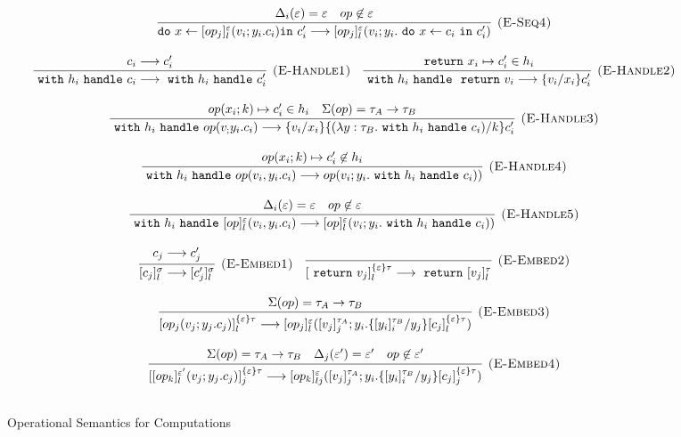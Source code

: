 \begin{figure}[p]
{\[\begin{array}{c}
\infer[\textsc{(E-Seq4)}]
  {\texttt{do}\ x \leftarrow [op_j]^\varepsilon_l(v_i; y_i.c_i) \texttt{in}\ c_i' \longrightarrow [op_j]^\varepsilon_l(v_i; y_i. \m{do} x \leftarrow c_i \m{in} c_i')}
  {\Delta_i(\varepsilon) = \varepsilon & op \not \in \varepsilon} \\[3ex]
  

  
 \infer[\textsc{(E-Handle1)}]
  {\m{with} h_i \m{handle} c_i \longrightarrow \m{with} h_i \m{handle} c_i' }
  {c_i \longrightarrow c_i'} \quad
  
\infer[\textsc{(E-Handle2)}]
  {\m{with} h_i \m{handle} \m{return} v_i \longrightarrow \{v_i/x_i\}c_i' }
  {\m{return} x_i \mapsto	c_i' \in h_i} \\[3ex]
  
\infer[\textsc{(E-Handle3)}]
  {\m{with} h_i \m{handle} op(v_; y_i.c_i) \longrightarrow \{v_i/x_i\} \{(\lambda y: \tau_B.
   \m{with} h_i\m{handle} c_i) / k\}c_i' }
  {op(x_i; k) \mapsto c_i' \in h_i & \Sigma(op) = \tau_A \rightarrow \tau_B} \\[3ex]
 
 
\infer[\textsc{(E-Handle4)}]
  {\m{with} h_i \m{handle} op(v_i, y_i.c_i) \longrightarrow op(v_i; y_i. \m{with} h_i \m{handle} c_i))}
  {op(x_i; k) \mapsto c_i' \not\in h_i } \\[3ex]
  
\infer[\textsc{(E-Handle5)}]
  {\m{with} h_i \m{handle} [op]^\varepsilon_l(v_i, y_i.c_i) \longrightarrow [op]^\varepsilon_l(v_i; y_i. \m{with} h_i \m{handle} c_i))}
  {\Delta_i(\varepsilon) = \varepsilon & op \not \in \varepsilon} \\[3ex]
  
\infer[\textsc{(E-Embed1)}]
{[c_j]^\sigma_l \longrightarrow [c_j']^\sigma_l}
{c_j \longrightarrow c_j'} \quad 



\infer[\textsc{(E-Embed2)}]
{[\m{return} v_j]^{\{\varepsilon\}\tau}_l \longrightarrow \m{return} [v_j]^\tau_l}
{} \\[3ex]

\infer[\textsc{(E-Embed3)}]
{[op_j(v_j; y_j.c_j)]^{\{\varepsilon\}\tau}_l \longrightarrow [op_j]^\varepsilon_l([v_j]^{\tau_A}_j; y_i. \{[y_i]^{\tau_B}_i / y_j\}[c_j]^{\{\varepsilon\}\tau}_l)}
{ \Sigma(op) = \tau_A \rightarrow \tau_B} \\[3ex]

\infer[\textsc{(E-Embed4)}]
{[[op_k]^{\varepsilon'}_{l}(v_j; y_j.c_j)]^{\{\varepsilon\}\tau}_j \longrightarrow [op_k]^\varepsilon_{lj}([v_j]^{\tau_A}_j; y_i. \{[y_i]^{\tau_B}_i / y_j\}[c_j]^{\{\varepsilon\}\tau}_j)}
{ \Sigma(op) = \tau_A \rightarrow \tau_B& \Delta_j(\varepsilon') = \varepsilon' & op \not \in \varepsilon'} \\[3ex]



\end{array}
\]

}
\caption{Operational Semantics for Computations}
\label{fig-op2}

\end{figure}

